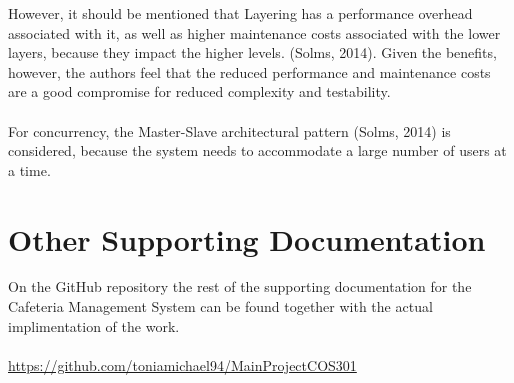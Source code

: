 \documentclass[a4paper,12pt]{article}
\begin{document}
		However, it should be mentioned that Layering has a performance overhead associated with it, as well as higher maintenance costs associated with the lower layers, because they impact the higher levels. (Solms, 2014). Given the benefits, however, the authors feel that the reduced performance and maintenance costs are a good compromise for reduced complexity and testability.\\
		\\
		For concurrency, the Master-Slave architectural pattern (Solms, 2014) is considered, because the system needs to accommodate a large number of users at a time.

\section{Other Supporting Documentation}

On the GitHub repository the rest of the supporting documentation for the Cafeteria Management System can be found together with the actual implimentation of the work. \\\\
 \url{https://github.com/toniamichael94/MainProjectCOS301}

\newpage
\end{document}
